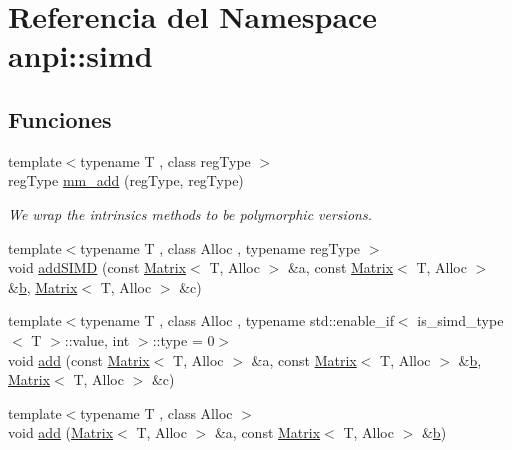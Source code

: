 \hypertarget{namespaceanpi_1_1simd}{}\section{Referencia del Namespace anpi\+:\+:simd}
\label{namespaceanpi_1_1simd}
\subsection*{Funciones}
\begin{DoxyCompactItemize}
\item 
{\footnotesize template$<$typename T , class reg\+Type $>$ }\\reg\+Type \hyperlink{namespaceanpi_1_1simd_a806b5ccd28c228e97b86cc94662c73b1}{mm\+\_\+add} (reg\+Type, reg\+Type)
\begin{DoxyCompactList}\small\item\em We wrap the intrinsics methods to be polymorphic versions. \end{DoxyCompactList}\item 
{\footnotesize template$<$typename T , class Alloc , typename reg\+Type $>$ }\\void \hyperlink{namespaceanpi_1_1simd_a68e80d90707dc4526ef25ded81768ad0}{add\+S\+I\+MD} (const \hyperlink{classanpi_1_1Matrix}{Matrix}$<$ T, Alloc $>$ \&a, const \hyperlink{classanpi_1_1Matrix}{Matrix}$<$ T, Alloc $>$ \&\hyperlink{program__options_8cpp_a03799bd905ea96cd38435410694bf05b}{b}, \hyperlink{classanpi_1_1Matrix}{Matrix}$<$ T, Alloc $>$ \&c)
\item 
{\footnotesize template$<$typename T , class Alloc , typename std\+::enable\+\_\+if$<$ is\+\_\+simd\+\_\+type$<$ T $>$\+::value, int $>$\+::type  = 0$>$ }\\void \hyperlink{namespaceanpi_1_1simd_ae4ef1d42aea6476578a669fb8c7109a1}{add} (const \hyperlink{classanpi_1_1Matrix}{Matrix}$<$ T, Alloc $>$ \&a, const \hyperlink{classanpi_1_1Matrix}{Matrix}$<$ T, Alloc $>$ \&\hyperlink{program__options_8cpp_a03799bd905ea96cd38435410694bf05b}{b}, \hyperlink{classanpi_1_1Matrix}{Matrix}$<$ T, Alloc $>$ \&c)
\item 
{\footnotesize template$<$typename T , class Alloc $>$ }\\void \hyperlink{namespaceanpi_1_1simd_a254bbb0c28defbf2348e5197607d61bc}{add} (\hyperlink{classanpi_1_1Matrix}{Matrix}$<$ T, Alloc $>$ \&a, const \hyperlink{classanpi_1_1Matrix}{Matrix}$<$ T, Alloc $>$ \&\hyperlink{program__options_8cpp_a03799bd905ea96cd38435410694bf05b}{b})
\item 

\end{DoxyCompactItemize}
